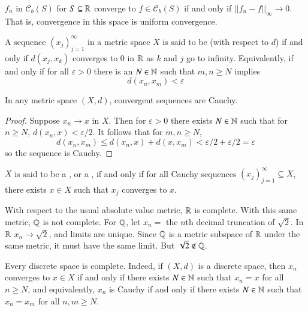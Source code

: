 \begin{example}
    $f_n$ in $\mathcal{C}_b(S)$ for $S \subseteq \mathbb R$ converge to $f \in \mathcal{C}_b(S)$ if and only if $||f_n-f||_{\infty}\rightarrow 0$. That is, convergence in this space is uniform convergence.
\end{example}


\begin{definition}
    A sequence $(x_j)_{j=1}^{\infty}$ in a metric space $X$ is said to be  (with respect to $d$) if and only if $d(x_j,x_k)$ converges to $0$ in $\mathbb R$ as $k$ and $j$ go to infinity. Equivalently, if and only if for all $\varepsilon > 0$ there is an $N \in \mathbb N$ such that $m,n \geq N$ implies $$d(x_n,x_m) < \varepsilon$$
\end{definition}

\begin{proposition}
    In any metric space $(X,d)$, convergent sequences are Cauchy.
\end{proposition}
\begin{proof}
    Suppose $x_n\rightarrow x$ in $X$. Then for $\varepsilon > 0$ there exists $N \in \mathbb N$ such that for $n \geq N$, $d(x_n,x) < \varepsilon/2$. It follows that for $m,n \geq N$, $$d(x_n,x_m) \leq d(x_n,x) + d(x,x_m) < \varepsilon/2+\varepsilon/2 = \varepsilon$$ so the sequence is Cauchy.
\end{proof}


\begin{definition}
    $X$ is said to be a , or a , if and only if for all Cauchy sequences $(x_j)_{j=1}^{\infty} \subseteq X$, there exists $x \in X$ such that $x_j$ converges to $x$.
\end{definition}

\begin{example}
    With respect to the usual absolute value metric, $\mathbb R$ is complete. With this same metric, $\mathbb Q$ is not complete. For $\mathbb Q$, let $x_n = $ the $n$th decimal truncation of $\sqrt{2}$. In $\mathbb R$ $x_n\rightarrow \sqrt{2}$, and limits are unique. Since $\mathbb Q$ is a metric subspace of $\mathbb R$ under the same metric, it must have the same limit. But $\sqrt{2} \notin \mathbb Q$.
\end{example}

\begin{example}
    Every discrete space is complete. Indeed, if $(X,d)$ is a discrete space, then $x_n$ converges to $x \in X$ if and only if there exists $N \in \mathbb N$ such that $x_n = x$ for all $n \geq N$, and equivalently, $x_n$ is Cauchy if and only if there exists $N \in \mathbb N$ such that $x_n = x_m$ for all $n,m \geq N$.
\end{example}

